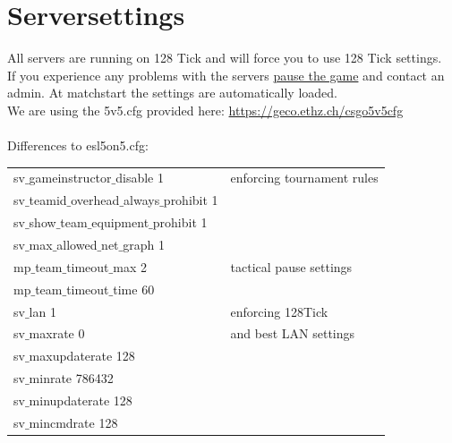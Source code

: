 \documentclass{article}
\begin{document}
\section{Serversettings}
All servers are running on 128 Tick and will force you to use 128 Tick settings.\\
If you experience any problems with the servers \hyperref[sec:pause]{pause the game} and contact an admin. At matchstart the settings are automatically loaded.\\
We are using the 5v5.cfg provided here:
\url{https://geco.ethz.ch/csgo5v5cfg} \\\\
Differences to esl5on5.cfg:\\
\begin{tabular}{ | l | l | }
	\hline			
	sv$\_$gameinstructor$\_$disable 1 & enforcing tournament rules\\
	sv$\_$teamid$\_$overhead$\_$always$\_$prohibit 1 & \\
	sv$\_$show$\_$team$\_$equipment$\_$prohibit 1 & \\
	sv$\_$max$\_$allowed$\_$net$\_$graph 1 &  \\
	\hline
	mp$\_$team$\_$timeout$\_$max 2 & tactical pause settings\\
	mp$\_$team$\_$timeout$\_$time 60 & \\
	\hline
	sv$\_$lan 1 & enforcing 128Tick  \\
	sv$\_$maxrate 0 & and best LAN settings \\
	sv$\_$maxupdaterate 128 & \\
	sv$\_$minrate 786432 & \\
	sv$\_$minupdaterate 128 & \\
	sv$\_$mincmdrate 128 & \\
	\hline  
\end{tabular}
\end{document}
